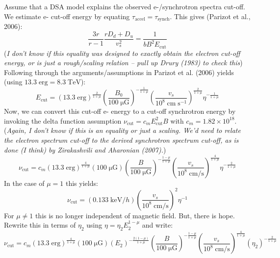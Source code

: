 \documentclass[manuscript]{aastex}  %
\newcommand*{\mt}{\mathrm}
\newcommand*{\unit}[1]{\;\mt{#1}}  %
\newcommand*{\Ecut}{E_{\mt{cut}}}
\newcommand*{\muG}{\unit{\mu G}}
\begin{document}
Assume that a DSA model explains the observed e-/synchrotron spectra
cut-off.  We estimate e- cut-off energy by equating
$\tau_{\mt{accel}} = \tau_{\mt{synch}}$.  This gives (Parizot et al., 2006):
\begin{equation}
    \frac{3r}{r-1} \frac{r D_d + D_u}{v_s^2} = \frac{1}{b B^2 \Ecut}
\end{equation}
(\emph{I don't know if this equality was designed to exactly obtain the electron
cut-off energy, or is just a rough/scaling relation -- pull up Drury (1983) to
check this})
Following through the arguments/assumptions in Parizot et al. (2006) yields
(using $13.3 \unit{erg} = 8.3 \unit{TeV}$):
\begin{equation}
    \Ecut =
        \left( 13.3 \unit{erg} \right)^{\frac{2}{1+\mu}}
        \left( \frac{B_0}{100 \muG} \right)^{-\frac{1}{1+\mu}}
        \left( \frac{v_s}{10^8 \unit{cm\;s^{-1}}} \right)^{\frac{2}{1+\mu}}
        \eta^{-\frac{1}{1+\mu}}
\end{equation}
Now, we can convert this cut-off e- energy to a cut-off synchrotron energy by
invoking the delta function assumption $\nu_{\mt{cut}} = c_m \Ecut^2 B$ with
$c_m = 1.82 \times 10^{18}$.
(\emph{Again, I don't know if this is an equality or just a scaling.  We'd need
to relate the electron spectrum cut-off to the derived synchrotron spectrum
cut-off, as is done (I think) by Zirakashvili and Aharonian (2007).})
\begin{equation}
    \nu_{\mt{cut}} = c_m
        \left( 13.3 \unit{erg} \right)^{\frac{4}{1+\mu}}
        \left( 100 \muG \right)
        \left( \frac{B}{100\muG} \right)^{-\frac{1-\mu}{1+\mu}}
        \left( \frac{v_s}{10^8 \unit{cm/s}} \right)^{\frac{4}{1+\mu}}
        \eta^{-\frac{2}{1+\mu}}
\end{equation}
In the case of $\mu = 1$ this yields:
\begin{equation}
    \nu_{\mt{cut}} = (0.133 \unit{keV} / h)
        \left( \frac{v_s}{10^8 \unit{cm/s}} \right)^{2}
        \eta^{-1}
\end{equation}
For $\mu \neq 1$ this is no longer independent of magnetic field.  But,
there is hope.  Rewrite this in terms of $\eta_2$ using
$\eta = \eta_2 E_2^{1-\mu}$ and write:
\[
    \nu_{\mt{cut}} = c_m
        \left( 13.3 \unit{erg} \right)^{\frac{4}{1+\mu}}
        \left( 100 \muG \right)
        \left( E_2 \right)^{-\frac{2(1-\mu)}{1+\mu}}
        \left( \frac{B}{100\muG} \right)^{-\frac{1-\mu}{1+\mu}}
        \left( \frac{v_s}{10^8 \unit{cm/s}} \right)^{\frac{4}{1+\mu}}
        \left( \eta_2 \right)^{-\frac{2}{1+\mu}}
\]
\end{document}
